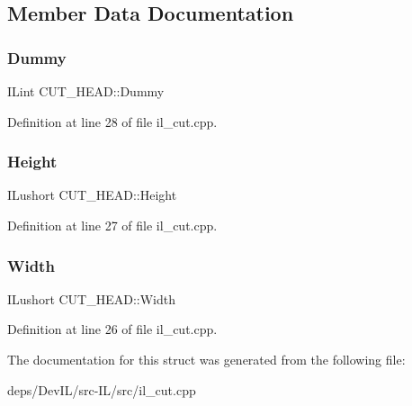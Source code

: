 \subsection{Member Data Documentation}
\mbox{\label{structCUT__HEAD_ac428d0196446d1b75ff3a5e4199130bc}} 
\subsubsection{\texorpdfstring{Dummy}{Dummy}}
{\footnotesize\ttfamily I\+Lint C\+U\+T\+\_\+\+H\+E\+A\+D\+::\+Dummy}



Definition at line 28 of file il\+\_\+cut.\+cpp.

\mbox{\label{structCUT__HEAD_ad251737d5f7dd51ea66f4e9933c73a49}} 
\subsubsection{\texorpdfstring{Height}{Height}}
{\footnotesize\ttfamily I\+Lushort C\+U\+T\+\_\+\+H\+E\+A\+D\+::\+Height}



Definition at line 27 of file il\+\_\+cut.\+cpp.

\mbox{\label{structCUT__HEAD_a9ff13a216083856a33dab7deef271a46}} 
\subsubsection{\texorpdfstring{Width}{Width}}
{\footnotesize\ttfamily I\+Lushort C\+U\+T\+\_\+\+H\+E\+A\+D\+::\+Width}



Definition at line 26 of file il\+\_\+cut.\+cpp.



The documentation for this struct was generated from the following file\+:\begin{DoxyCompactItemize}
\item 
deps/\+Dev\+I\+L/src-\/\+I\+L/src/il\+\_\+cut.\+cpp\end{DoxyCompactItemize}
